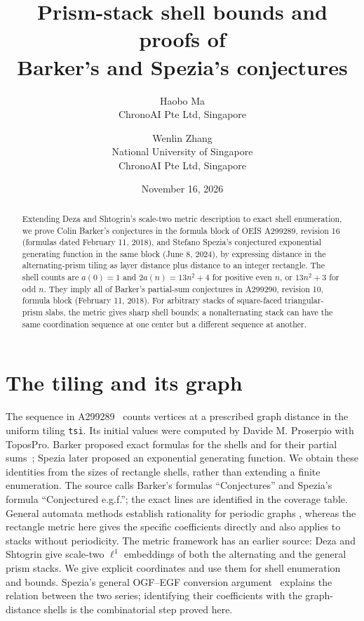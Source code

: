 \documentclass[10pt]{article}
\title{Prism-stack shell bounds and proofs of\\Barker's and Spezia's conjectures}
\author{Haobo Ma\\\small ChronoAI Pte Ltd, Singapore
\and Wenlin Zhang\\\small National University of Singapore\\\small ChronoAI Pte Ltd, Singapore}
\date{November 16, 2026}
\begin{document}
\maketitle
\begin{abstract}
Extending Deza and Shtogrin's scale-two metric description
\cite[Tables 3--4]{deza} to exact shell enumeration, we prove
Colin Barker's conjectures in the formula block of OEIS A299289,
revision 16 (formulas dated February 11, 2018), and Stefano Spezia's conjectured exponential
generating function in the same block (June 8, 2024), by expressing distance
in the alternating-prism tiling as layer distance plus distance to an
integer rectangle.
The shell counts are $a(0)=1$ and $2a(n)=13n^2+4$ for positive even $n$,
or $13n^2+3$ for odd $n$.
They imply all of Barker's partial-sum conjectures in A299290,
revision 10, formula block (February 11, 2018).
For arbitrary stacks of square-faced triangular-prism slabs, the metric
gives sharp shell bounds; a nonalternating stack can have the same
coordination sequence at one center but a different sequence at another.
\end{abstract}

\section{The tiling and its graph}
The sequence in A299289~\cite{oeis} counts vertices at a prescribed graph
distance in the uniform tiling \texttt{tsi}. Its initial values were
computed by Davide M. Proserpio with ToposPro. Barker proposed exact
formulas for the shells and for their partial sums~\cite{balls}; Spezia
later proposed an exponential generating function. We obtain these
identities from the sizes of rectangle shells, rather than extending a
finite enumeration.
The source calls Barker's formulas ``Conjectures'' and Spezia's formula
``Conjectured e.g.f.''; the exact lines are identified in the coverage table.
General automata methods establish rationality for periodic graphs
\cite{kopczynski}, whereas the rectangle metric here gives the specific
coefficients directly and also applies to stacks without periodicity.
The metric framework has an earlier source: Deza and Shtogrin
\cite[Table 3, row 27; Table 4, row 32; \S5]{deza} give scale-two
$\ell^1$ embeddings of both the alternating and the general prism stacks.
We give explicit coordinates and use them for shell enumeration and bounds.
Spezia's general OGF--EGF conversion argument~\cite{spezia} explains
the relation between the two series; identifying their coefficients with
the graph-distance shells is the combinatorial step proved here.
\end{document}
